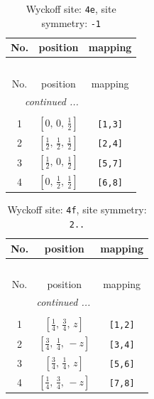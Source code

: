 \documentclass[fleqn,8pt]{jsarticle}
\begin{document}
\begin{longtable}{ccc}
\caption{Wyckoff site: {\tt 4e}, site symmetry: {\tt -1}}
 \\
 \hline \hline
No. & position & mapping \\ \hline \endfirsthead

\multicolumn{2}{l}{\tablename\ \thetable{}} \\
 \hline \hline
No. & position & mapping \\ \hline \endhead

 \hline \hline
\multicolumn{2}{r}{\footnotesize\it continued ...} \\ \endfoot

 \hline \hline
\multicolumn{2}{r}{} \\ \endlastfoot

1 & $\left[ 0,\, 0,\, \frac{1}{2} \right]$ & {\tt [1,3]} \\ \hline
2 & $\left[ \frac{1}{2},\, \frac{1}{2},\, \frac{1}{2} \right]$ & {\tt [2,4]} \\ \hline
3 & $\left[ \frac{1}{2},\, 0,\, \frac{1}{2} \right]$ & {\tt [5,7]} \\ \hline
4 & $\left[ 0,\, \frac{1}{2},\, \frac{1}{2} \right]$ & {\tt [6,8]} \\
\end{longtable}
\renewcommand{\arraystretch}{1.2}
\begin{longtable}{ccc}
\caption{Wyckoff site: {\tt 4f}, site symmetry: {\tt 2..}}
 \\
 \hline \hline
No. & position & mapping \\ \hline \endfirsthead

\multicolumn{2}{l}{\tablename\ \thetable{}} \\
 \hline \hline
No. & position & mapping \\ \hline \endhead

 \hline \hline
\multicolumn{2}{r}{\footnotesize\it continued ...} \\ \endfoot

 \hline \hline
\multicolumn{2}{r}{} \\ \endlastfoot

1 & $\left[ \frac{1}{4},\, \frac{3}{4},\, z \right]$ & {\tt [1,2]} \\ \hline
2 & $\left[ \frac{3}{4},\, \frac{1}{4},\, - z \right]$ & {\tt [3,4]} \\ \hline
3 & $\left[ \frac{3}{4},\, \frac{1}{4},\, z \right]$ & {\tt [5,6]} \\ \hline
4 & $\left[ \frac{1}{4},\, \frac{3}{4},\, - z \right]$ & {\tt [7,8]} \\
\end{longtable}
\end{document}
